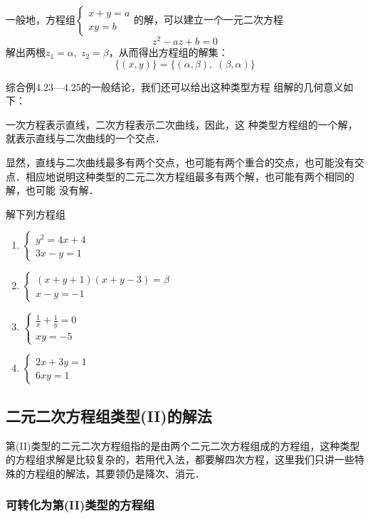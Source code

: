 一般地，方程组$\begin{cases}
x+y=a\\ xy=b
\end{cases}$的解，可以建立一个一元二次方程
\[z^2-az+b=0\]
解出两根$z_1=\alpha,\; z_2=\beta$，从而得出方程组的解集：
\[\{(x,y)\}=\{(\alpha,\beta ),\; (\beta ,\alpha)\}\]

综合例4.23---4.25的一般结论，我们还可以给出这种类型方程
组解的几何意义如下：

一次方程表示直线，二次方程表示二次曲线，因此，这
种类型方程组的一个解，就表示直线与二次曲线的一个交点．

显然，直线与二次曲线最多有两个交点，也可能有两个重合的交点，也可能没有交点．相应地说明这种类型的二元二次方程组最多有两个解，也可能有两个相同的解，也可能
没有解．

\begin{ex}
解下列方程组
\begin{multicols}{2}
\begin{enumerate}
\item $\begin{cases}
y^2=4x+4\\3x-y=1
\end{cases}$
\item $\begin{cases}
(x+y+1)(x+y-3)=\beta\\
x-y=-1
\end{cases}$
\item $\begin{cases}
\frac{1}{x}+\frac{1}{y}=0\\
xy=-5
\end{cases}$
\item $\begin{cases}
2x+3y=1\\ 6xy=1
\end{cases}$
\end{enumerate}
\end{multicols}
\end{ex}

\subsection{二元二次方程组类型(II)的解法}

第(II)类型的二元二次方程组指的是由两个二元二次方程组成的方程组，这种类型的方程组求解是比较复杂的，若用代入法，都要解四次方程，这里我们只讲一些特殊的方程组的解法，其要领仍是降次、消元．

\subsubsection{可转化为第(II)类型的方程组}

